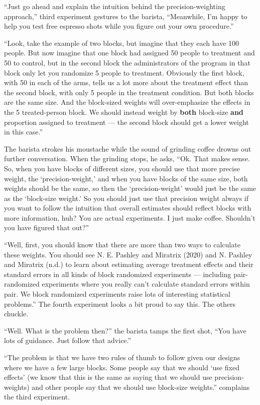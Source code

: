 \documentclass[
]{article}
\begin{document}
``Just go ahead and explain the intuition behind the precision-weighting approach,'' third experiment gestures to the barista, ``Meanwhile, I'm happy to help you test free espresso shots while you figure out your own procedure.''

``Look, take the example of two blocks, but imagine that they each have 100 people. But now imagine that one block had assigned 50 people to treatment and 50 to control, but in the second block the administrators of the program in that block only let you randomize 5 people to treatment. Obviously the first block, with 50 in each of the arms, tells us a lot more about the treatment effect than the second block, with only 5 people in the treatment condition. But both blocks are the same size. And the block-sized weights will over-emphasize the effects in the 5 treated-person block. We should instead weight by \textbf{both} block-size \textbf{and} proportion assigned to treatment --- the second block should get a lower weight in this case.''

The barista strokes his moustache while the sound of grinding coffee drowns out further conversation. When the grinding stops, he asks, ``Ok. That makes sense. So, when you have blocks of different sizes, you should use that more precise weight, the `precision-weight,' and when you have blocks of the same size, both weights should be the same, so then the `precision-weight' would just be the same as the `block-size weight.' So you should just use that precision weight always if you want to follow the intuition that overall estimates should reflect blocks with more information, huh? You are actual experiments. I just make coffee. Shouldn't you have figured that out?''

``Well, first, you should know that there are more than two ways to calculate these weights. You should see N. E. Pashley and Miratrix (2020) and N. Pashley and Miratrix (n.d.) to learn about estimating average treatment effects and their standard errors in all kinds of block randomized experiments --- including pair-randomized experiments where you really can't calculate standard errors within pair. We block randomized experiments raise lots of interesting statistical problems.'' The fourth experiment looks a bit proud to say this. The others chuckle.

``Well. What is the problem then?'' the barista tamps the first shot, ``You have lots of guidance. Just follow that advice.''

``The problem is that we have two rules of thumb to follow given our designs where we have a few large blocks. Some people say that we should `use fixed effects' (we know that this is the same as saying that we should use precision-weights) and other people say that we should use block-size weights.'' complains the third experiment.
\end{document}
